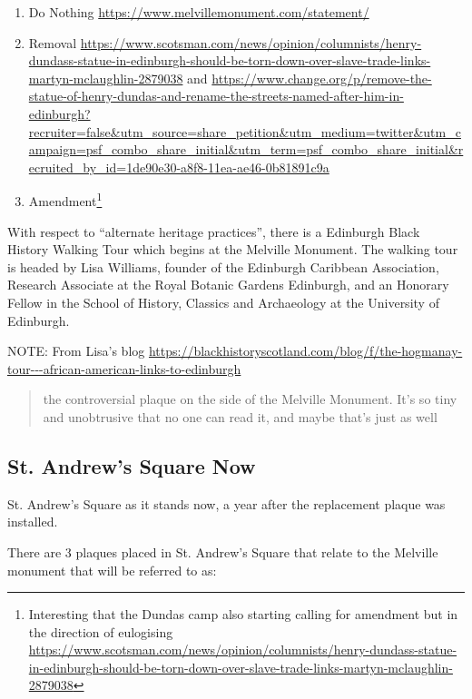 \documentclass{scrartcl}
\begin{document}
\begin{enumerate}
    \item Do Nothing \url{https://www.melvillemonument.com/statement/}
    \item Removal \url{https://www.scotsman.com/news/opinion/columnists/henry-dundass-statue-in-edinburgh-should-be-torn-down-over-slave-trade-links-martyn-mclaughlin-2879038} and \url{https://www.change.org/p/remove-the-statue-of-henry-dundas-and-rename-the-streets-named-after-him-in-edinburgh?recruiter=false&utm_source=share_petition&utm_medium=twitter&utm_campaign=psf_combo_share_initial&utm_term=psf_combo_share_initial&recruited_by_id=1de90e30-a8f8-11ea-ae46-0b81891c9a}
    \item Amendment\footnote{Interesting that the Dundas camp also starting calling for amendment but in the direction of eulogising \url{https://www.scotsman.com/news/opinion/columnists/henry-dundass-statue-in-edinburgh-should-be-torn-down-over-slave-trade-links-martyn-mclaughlin-2879038}} \cite{esclr_2022}
\end{enumerate}

With respect to ``alternate heritage practices'', there is a Edinburgh Black History Walking Tour which begins at the Melville Monument.
The walking tour is headed by Lisa Williams, founder of the Edinburgh Caribbean Association, Research Associate at the Royal Botanic Gardens Edinburgh, and an Honorary Fellow in the School of History, Classics and Archaeology at the University of Edinburgh. 

NOTE: From Lisa's blog \url{https://blackhistoryscotland.com/blog/f/the-hogmanay-tour---african-american-links-to-edinburgh}

\begin{quotation}
    the controversial plaque on the side of the Melville Monument. It's so tiny and unobtrusive that no one can read it, and maybe that's just as well
\end{quotation}



\subsection{St. Andrew's Square Now}

St. Andrew's Square as it stands now, a year after the replacement plaque was installed.

There are 3 plaques placed in St. Andrew's Square that relate to the Melville monument that will be referred to as: 
\end{document}
